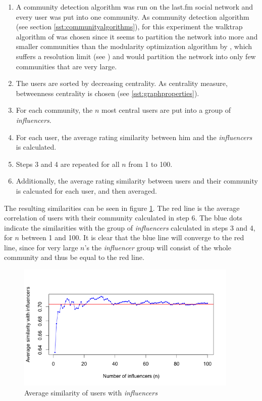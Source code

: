 \begin{enumerate}
\item A community detection algorithm was run on the last.fm social network and every user was put into one community. As community detection algorithm (see section \ref{sst:communityalgorithms}), for this experiment the walktrap algorithm of \cite{Pons_2005} was chosen since it seems to partition the network into more and smaller communities than the modularity optimization algorithm by \cite{Clauset_2004}, which suffers a resolution limit (see \cite{Fortunato_2007}) and would partition the network into only few communities that are very large.
\item The users are sorted by decreasing centrality. As centrality measure, betweenness centrality is chosen (see \ref{sst:graphproperties}).
\item For each community, the $n$ most central users are put into a group of \textit{influencers}.
\item For each user, the average rating similarity between him and the \textit{influencers} is calculated.
\item Steps 3 and 4 are repeated for all $n$ from 1 to 100.
\item Additionally, the average rating similarity between users and their community is calcuated for each user, and then averaged.
\end{enumerate}

The resulting similarities can be seen in figure \ref{f:influencersimilarity}. The red line is the average correlation of users with their community calculated in step 6. The blue dots indicate the similarities with the group of \textit{influencers} calculated in steps 3 and 4, for $n$ between 1 and 100. It is clear that the blue line will converge to the red line, since for very large $n$'s the \textit{influencer} group will consist of the whole community and thus be equal to the red line.

\begin{figure}[!h]
\includegraphics[width=400px]{./4-experiments/figures/InfluencerSimilarities_2.png}
\caption{Average similarity of users with \textit{influencers}}
\label{f:influencersimilarity}
\end{figure}

